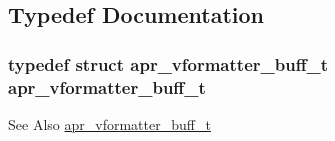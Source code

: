 \subsection{Typedef Documentation}
\hypertarget{group__apr__lib_ga5e9986deebda40f2d1cf8364fa03c3c5}{
\subsubsection[{apr\-\_\-vformatter\-\_\-buff\-\_\-t}]{\setlength{\rightskip}{0pt plus 5cm}typedef struct {\bf apr\-\_\-vformatter\-\_\-buff\-\_\-t} {\bf apr\-\_\-vformatter\-\_\-buff\-\_\-t}}}\label{group__apr__lib_ga5e9986deebda40f2d1cf8364fa03c3c5}
\begin{DoxySeeAlso}{See Also}
\hyperlink{structapr__vformatter__buff__t}{apr\-\_\-vformatter\-\_\-buff\-\_\-t} 
\end{DoxySeeAlso}


